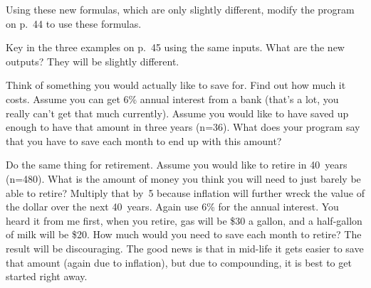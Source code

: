 \noindent Using these new formulas, which are only slightly different, modify the program on p.~44 to use these formulas.

\bigskip


\bigskip

\noindent Key in the three examples on p.~45 using the same inputs. What are the new outputs? They will be slightly different.

\bigskip


\bigskip

\noindent Think of something you would actually like to save for. Find out how much it costs. Assume you can get 6\% annual interest from a bank (that's a lot, you really can't get that much currently). Assume you would like to have saved up enough to have that amount in three years (n=36). What does your program say that you have to save each month to end up with this amount?

\bigskip


\bigskip

\noindent Do the same thing for retirement. Assume you would like to retire in 40~years (n=480). What is the amount of money you think you will need to just barely be able to retire? Multiply that by~5 because inflation will further wreck the value of the dollar over the next 40~years. Again use 6\% for the annual interest. You heard it from me first, when you retire, gas will be \$30 a gallon, and a half-gallon of milk will be \$20. How much would you need to save each month to retire? The result will be discouraging. The good news is that in mid-life it gets easier to save that amount (again due to inflation), but due to compounding, it is best to get started right away.

\bigskip

\bye
